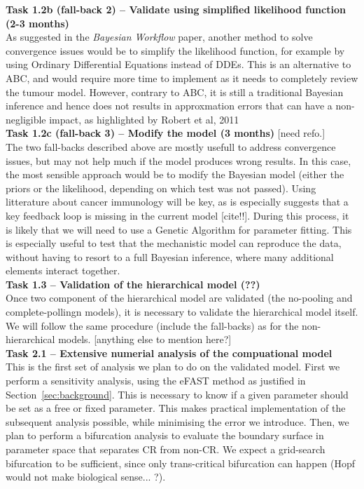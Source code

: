 \documentclass[11pt]{article}
\begin{document}
%
\noindent\textbf{Task 1.2b (fall-back 2) -- Validate using simplified likelihood function (2-3 months)}\\
As suggested in the \textit{Bayesian Workflow} paper, another method to solve convergence issues would be to simplify the likelihood function, for example by using Ordinary Differential Equations instead of DDEs. This is an alternative to ABC, and would require more time to implement as it needs to completely review the tumour model. However, contrary to ABC, it is still a traditional Bayesian inference and hence does not results in approxmation errors that can have a non-negligible impact, as highlighted by Robert et al, 2011 \cite{ABCerror}\\[12pt] 
%
\noindent\textbf{Task 1.2c (fall-back 3) -- Modify the model (3 months)} [need refo.]\\ 
The two fall-backs described above are mostly usefull to address convergence issues, but may not help much if the model produces wrong results. In this case, the most sensible approach would be to modify the Bayesian model (either the priors or the likelihood, depending on which test was not passed). Using litterature about cancer immunology will be key, as is especially suggests that a key feedback loop is missing in the current model [cite!!]. During this process, it is likely that we will need to use a Genetic Algorithm for parameter fitting. This is especially useful to test that the mechanistic model can reproduce the data, without having to resort to a full Bayesian inference, where many additional elements interact together. \\[12pt] 
%
\noindent\textbf{Task 1.3 -- Validation of the hierarchical model (??)}\\ 
Once two component of the hierarchical model are validated (the no-pooling and complete-pollingn models), it is necessary to validate the hierarchical model itself. We will follow the same procedure (include the fall-backs) as for the non-hierarchical models. [anything else to mention here?]\\[12pt]
%
\noindent\textbf{Task 2.1 -- Extensive numerial analysis of the compuational model}\\ 
This is the first set of analysis we plan to do on the validated model. First we perform a sensitivity analysis, using the eFAST method as justified in Section~\ref{sec:background}. This is necessary to know if a given parameter should be set as a free or fixed parameter. This makes practical implementation of the subsequent analysis possible, while minimising the error we introduce. Then, we plan to perform a bifurcation analysis to evaluate the boundary surface in parameter space that separates CR from non-CR. We expect a grid-search bifurcation to be sufficient, since only trans-critical bifurcation can happen (Hopf would not make biological sense... ?). \\[12pt]
\end{document}
